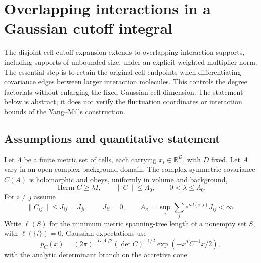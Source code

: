 
\section{Overlapping interactions in a Gaussian cutoff integral}
\label{oi-section}

The disjoint-cell cutoff expansion extends to overlapping interaction
supports, including supports of unbounded size, under an explicit
weighted multiplier norm. The essential step is to retain the original
cell endpoints when differentiating covariance edges between larger
interaction molecules. This controls the degree factorials without
enlarging the fixed Gaussian cell dimension. The statement below is
abstract; it does not verify the fluctuation coordinates or interaction
bounds of the Yang--Mills construction.

\subsection{Assumptions and quantitative statement}

Let $\Lambda$ be a finite metric set of cells, each carrying
$x_i\in\mathbb R^D$, with $D$ fixed. Let $A$ vary in an open complex
background domain. The complex symmetric covariance $C(A)$ is
holomorphic and obeys, uniformly in volume and background,
\begin{equation}\label{oi-covariance}
 \operatorname{Herm}C\ge\lambda I,\qquad
 \|C\|\le\Lambda_0,\qquad 0<\lambda\le\Lambda_0.
\end{equation}
For $i\ne j$ assume
\begin{equation}\label{oi-decay}
 \|C_{ij}\|\le J_{ij}=J_{ji},\qquad J_{ii}=0,\qquad
 A_\kappa=\sup_i\sum_j e^{\kappa d(i,j)}J_{ij}<\infty.
\end{equation}
Write $\ell(S)$ for the minimum metric spanning-tree length of a
nonempty set $S$, with $\ell(\{i\})=0$. Gaussian expectations use
\[
 p_C(x)=(2\pi)^{-D|\Lambda|/2}(\det C)^{-1/2}
                     \exp(-x^TC^{-1}x/2),
\]
with the analytic determinant branch on the accretive cone.

